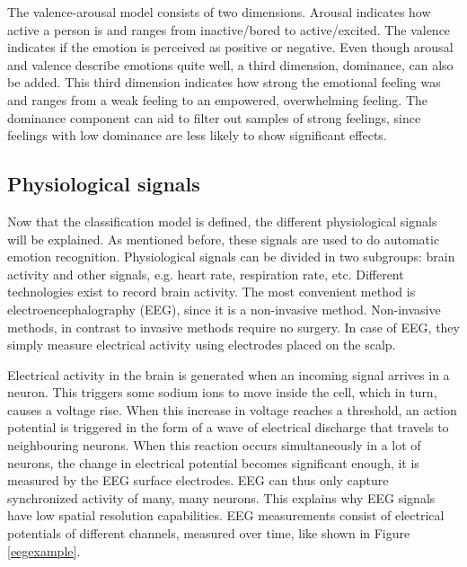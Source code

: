 \clearpage

The valence-arousal model consists of two dimensions. Arousal indicates how active a person is and ranges from inactive/bored to active/excited. The valence indicates if the emotion is perceived as positive or negative. Even though arousal and valence describe emotions quite well, a third dimension, dominance, can also be added. This third dimension indicates how strong the emotional feeling was and ranges from a weak feeling to an empowered, overwhelming feeling. The dominance component can aid to filter out samples of strong feelings, since feelings with low dominance are less likely to show significant effects.


\subsection{Physiological signals}

Now that the classification model is defined, the different physiological signals will be explained. As mentioned before, these signals are used to do automatic emotion recognition. Physiological signals can be divided in two subgroups: brain activity and other signals, e.g. heart rate, respiration rate, etc. Different technologies exist to record brain activity. The most convenient method is electroencephalography (EEG), since it is a non-invasive method. Non-invasive methods, in contrast to invasive methods require no surgery. In case of EEG, they simply measure electrical activity using electrodes placed on the scalp.

\npar

Electrical activity in the brain is generated when an incoming signal arrives in a neuron. This triggers some sodium ions to move inside the cell, which in turn, causes a voltage rise\cite{ExtendedPaper}. When this increase in voltage reaches a threshold, an action potential is triggered in the form of a wave of electrical discharge that travels to neighbouring neurons. When this reaction occurs simultaneously in a lot of neurons, the change in electrical potential becomes significant enough, it is measured by the EEG surface electrodes. EEG can thus only capture synchronized activity of many, many neurons\cite{ExtendedPaper}. This explains why EEG signals have low spatial resolution capabilities. EEG measurements consist of electrical potentials of different channels, measured over time, like shown in Figure \ref{eegexample}.

